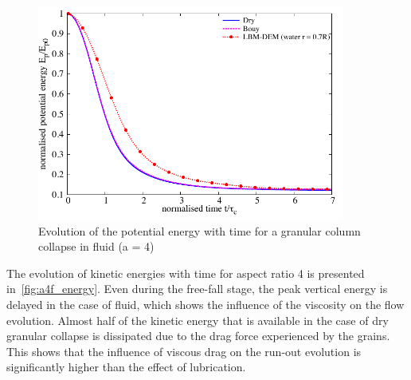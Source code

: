 \begin{figure}
	\centering
    \includegraphics[width=0.9\textwidth]{PE_a4f}
    \caption{Evolution of the potential energy with time for a granular column 
    collapse in fluid (a = 4)}
    \label{fig:PE_a4f}
\end{figure}

The evolution of kinetic energies with time for aspect ratio 4 is presented 
in~\cref{fig:a4f_energy}. Even during the free-fall stage, the peak vertical 
energy is delayed in the case of fluid, which shows the influence of the 
viscosity on the flow evolution. Almost half of the kinetic energy that is 
available in the case of dry granular collapse is dissipated due to the drag 
force experienced by the grains. This shows that the influence of viscous drag 
on the run-out evolution is significantly higher than the effect of lubrication.

